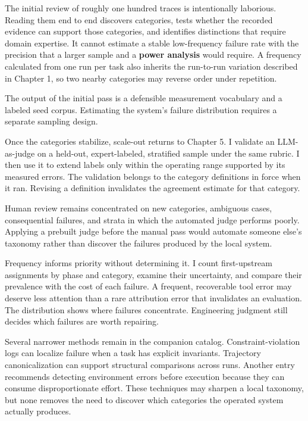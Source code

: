 The initial review of roughly one hundred traces is intentionally laborious. Reading them end to end discovers categories, tests whether the recorded evidence can support those categories, and identifies distinctions that require domain expertise. It cannot estimate a stable low-frequency failure rate with the precision that a larger sample and a \textbf{power analysis} would require. A frequency calculated from one run per task also inherits the run-to-run variation described in Chapter 1, so two nearby categories may reverse order under repetition.

The output of the initial pass is a defensible measurement vocabulary and a labeled seed corpus. Estimating the system's failure distribution requires a separate sampling design.

Once the categories stabilize, scale-out returns to Chapter 5. I validate an LLM-as-judge on a held-out, expert-labeled, stratified sample under the same rubric. I then use it to extend labels only within the operating range supported by its measured errors. The validation belongs to the category definitions in force when it ran. Revising a definition invalidates the agreement estimate for that category.

Human review remains concentrated on new categories, ambiguous cases, consequential failures, and strata in which the automated judge performs poorly. Applying a prebuilt judge before the manual pass would automate someone else's taxonomy rather than discover the failures produced by the local system.

Frequency informs priority without determining it. I count first-upstream assignments by phase and category, examine their uncertainty, and compare their prevalence with the cost of each failure. A frequent, recoverable tool error may deserve less attention than a rare attribution error that invalidates an evaluation. The distribution shows where failures concentrate. Engineering judgment still decides which failures are worth repairing.

Several narrower methods remain in the companion catalog. Constraint-violation logs can localize failure when a task has explicit invariants. Trajectory canonicalization can support structural comparisons across runs. Another entry recommends detecting environment errors before execution because they can consume disproportionate effort. These techniques may sharpen a local taxonomy, but none removes the need to discover which categories the operated system actually produces.

